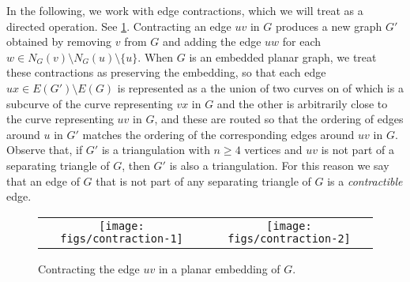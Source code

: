 \documentclass{patmorin}
\begin{document}
%

In the following, we work with edge contractions, which we will treat as a directed operation. See \cref{contraction}. Contracting an edge $uv$ in $G$ produces a new graph $G'$ obtained by removing $v$ from $G$ and adding the edge $uw$ for each $w\in N_G(v)\setminus N_G(u)\setminus\{u\}$.  When $G$ is an embedded planar graph, we treat these contractions as preserving the embedding, so that each edge $ux\in E(G')\setminus E(G)$ is represented as a the union of two curves on of which is a subcurve of the curve representing $vx$ in $G$ and the other is arbitrarily close to the curve representing $uv$ in $G$, and these are routed so that the ordering of edges around $u$ in $G'$ matches the ordering of the corresponding edges around $uv$ in $G$.  Observe that, if $G'$ is a triangulation with $n\ge 4$ vertices and $uv$ is not part of a separating triangle of $G$, then $G'$ is also a triangulation.  For this reason we say that an edge of $G$ that is not part of any separating triangle of $G$ is a \emph{contractible} edge.

\begin{figure}
    \begin{center}
        \begin{tabular}{cc}
            \texttt{[image: figs/contraction-1]} &
            \texttt{[image: figs/contraction-2]}
        \end{tabular}
    \end{center}
    \caption{Contracting the edge $uv$ in a planar embedding of $G$.}
    \label{contraction}
\end{figure}
\end{document}
